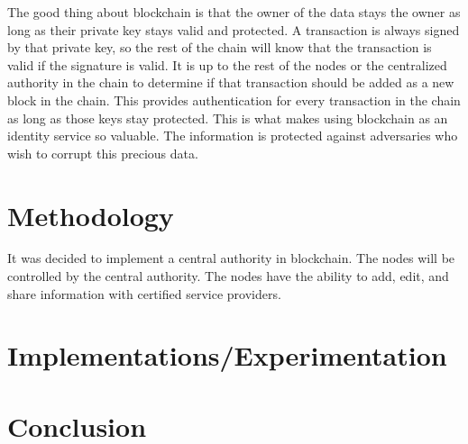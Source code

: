 \documentclass[letterpaper, 10 pt, conference]{ieeeconf}  %
\begin{document}
The good thing about blockchain is that the owner of the data stays the owner as long as their private key stays valid and protected. A transaction is always signed by that private key, so the rest of the chain will know that the transaction is valid if the signature is valid. It is up to the rest of the nodes or the centralized authority in the chain to determine if that transaction should be added as a new block in the chain. This provides authentication for every transaction in the chain as long as those keys stay protected. This is what makes using blockchain as an identity service so valuable. The information is protected against adversaries who wish to corrupt this precious data.

\section{Methodology}

It was decided to implement a central authority in blockchain. The nodes will be controlled by the central authority. The nodes have the ability to add, edit, and share information with certified service providers. 

\section{Implementations/Experimentation}

\section{Conclusion}



\end{document}
